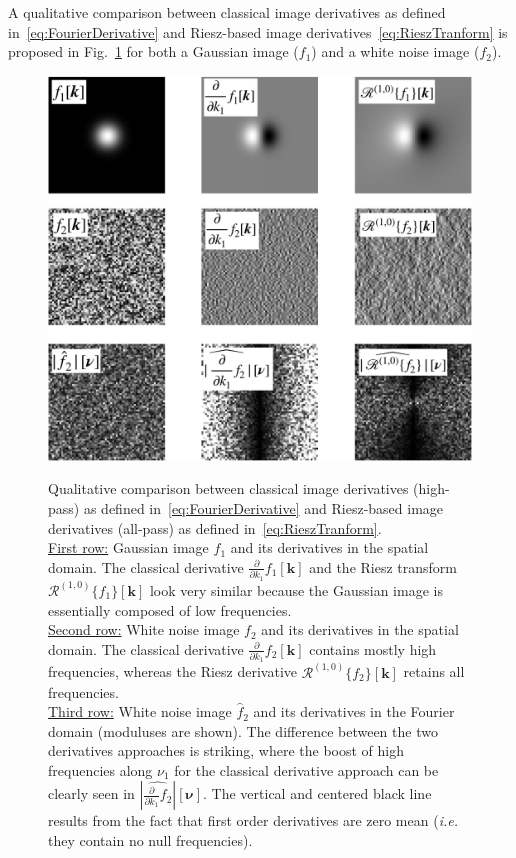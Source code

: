 \documentclass[fleqn,a4paper,oneside,openany]{book}
\begin{document}
A qualitative comparison between classical image derivatives as defined in~\eqref{eq:FourierDerivative} and Riesz-based image derivatives~\eqref{eq:RieszTranform} is proposed in Fig.~\ref{fig:rieszVSderivative} for both a Gaussian image ($f_1$) and a white noise image ($f_2$).
%
\begin{figure}
\centering
\includegraphics[trim = 0 0 0 0, clip, width=1\linewidth]{rieszVSderivative.png}\\
\caption{Qualitative comparison between classical image derivatives (high-pass) as defined in~\eqref{eq:FourierDerivative} and Riesz-based image derivatives (all-pass) as defined in~\eqref{eq:RieszTranform}.\\
\underline{First row:} Gaussian image $f_1$ and its derivatives in the spatial domain. The classical derivative $\frac{\partial}{\partial k_1} f_1[\boldsymbol{k}]$ and the Riesz transform $\mathcal{R}^{(1,0)}\{f_1\}[\boldsymbol{k}]$ look very similar because the Gaussian image is essentially composed of low frequencies.\\
\underline{Second row:} White noise image $f_2$ and its derivatives in the spatial domain. The classical derivative $\frac{\partial}{\partial k_1} f_2[\boldsymbol{k}]$ contains mostly high frequencies, whereas the Riesz derivative $\mathcal{R}^{(1,0)}\{f_2\}[\boldsymbol{k}]$  retains all frequencies.\\
\underline{Third row:} White noise image $\hat{f}_2$ and its derivatives in the Fourier domain (moduluses are shown). The difference between the two derivatives approaches is striking, where the boost of high frequencies along $\nu_1$ for the classical derivative approach can be clearly seen in $|\widehat{\frac{\partial}{\partial k_1} f_2}|[\boldsymbol{\nu}]$. The vertical and centered black line results from the fact that first order derivatives are zero mean (\emph{i.e.} they contain no null frequencies).}
  \label{fig:rieszVSderivative}
\end{figure}
%
\end{document}
